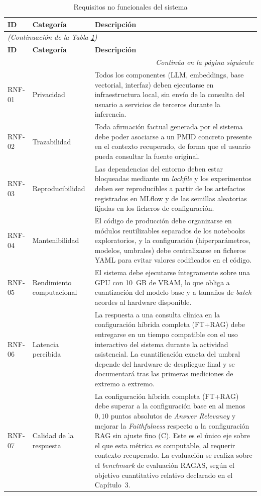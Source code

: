 \documentclass[11pt,a4paper,spanish]{book}
\numberwithin{equation}{chapter}
\numberwithin{figure}{chapter}
\begin{document}
{\small
\begin{longtable}{|p{}|p{}|p{}|}
\caption{Requisitos no funcionales del sistema}
\label{tab:rnf} \\
\hline
\textbf{ID} & \textbf{Categoría} & \textbf{Descripción} \\
\hline
\endfirsthead
\multicolumn{3}{l}{\textit{(Continuación de la Tabla \ref{tab:rnf})}} \\
\hline
\textbf{ID} & \textbf{Categoría} & \textbf{Descripción} \\
\hline
\endhead
\hline
\multicolumn{3}{r}{\textit{Continúa en la página siguiente}} \\
\endfoot
\hline
\endlastfoot
RNF-01 & Privacidad & Todos los componentes (LLM, embeddings, base vectorial, interfaz) deben ejecutarse en infraestructura local, sin envío de la consulta del usuario a servicios de terceros durante la inferencia. \\
\hline
RNF-02 & Trazabilidad & Toda afirmación factual generada por el sistema debe poder asociarse a un PMID concreto presente en el contexto recuperado, de forma que el usuario pueda consultar la fuente original. \\
\hline
RNF-03 & Reproducibilidad & Las dependencias del entorno deben estar bloqueadas mediante un \textit{lockfile} y los experimentos deben ser reproducibles a partir de los artefactos registrados en MLflow y de las semillas aleatorias fijadas en los ficheros de configuración. \\
\hline
RNF-04 & Mantenibilidad & El código de producción debe organizarse en módulos reutilizables separados de los notebooks exploratorios, y la configuración (hiperparámetros, modelos, umbrales) debe centralizarse en ficheros YAML para evitar valores codificados en el código. \\
\hline
RNF-05 & Rendimiento computacional & El sistema debe ejecutarse íntegramente sobre una GPU con 10~GB de VRAM, lo que obliga a cuantización del modelo base y a tamaños de \textit{batch} acordes al hardware disponible. \\
\hline
RNF-06 & Latencia percibida & La respuesta a una consulta clínica en la configuración híbrida completa (FT+RAG) debe entregarse en un tiempo compatible con el uso interactivo del sistema durante la actividad asistencial. La cuantificación exacta del umbral depende del hardware de despliegue final y se documentará tras las primeras mediciones de extremo a extremo. \\
\hline
RNF-07 & Calidad de la respuesta & La configuración híbrida completa (FT+RAG) debe superar a la configuración base en al menos $0{,}10$ puntos absolutos de \textit{Answer Relevancy} y mejorar la \textit{Faithfulness} respecto a la configuración RAG sin ajuste fino (C). Este es el único eje sobre el que esta métrica es computable, al requerir contexto recuperado. La evaluación se realiza sobre el \textit{benchmark} de evaluación RAGAS, según el objetivo cuantitativo relativo declarado en el Capítulo~3. \\

\end{longtable}}
\end{document}
